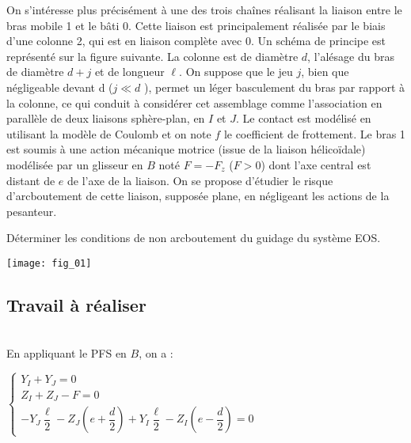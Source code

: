On s’intéresse plus précisément à une des trois chaînes réalisant la liaison entre le bras mobile 1 et le bâti
0. 
Cette liaison est principalement réalisée par le biais d’une colonne 2, qui est en liaison complète avec 0. Un schéma de principe est représenté sur la figure suivante. La colonne est de diamètre $d$, l’alésage du bras de diamètre
$d + j$ et  de longueur $\ell$. On suppose que le jeu $j$, bien que négligeable devant d ($j  \ll d$ ), permet un léger
basculement du bras par rapport à la colonne, ce qui conduit à considérer cet assemblage comme l’association en parallèle de deux liaisons sphère-plan, en $I$ et $J$. Le contact est modélisé en utilisant la modèle de Coulomb et on note $f$  le coefficient  de frottement. Le bras 1 est soumis à une action mécanique motrice (issue de la
liaison hélicoïdale) modélisée par un glisseur en $B$ noté $F = -F_z$ ($F > 0$) dont l’axe central est distant de $e$
de l’axe de la liaison. On se propose  d’étudier le risque d’arcboutement  de cette liaison, supposée plane, en négligeant les actions de la pesanteur.

\fi

\begin{obj}
Déterminer les conditions de non arcboutement du guidage du système EOS. 
\end{obj}


\ifprof
\else
\begin{center}
\texttt{[image: fig\_01]}
\end{center}

\fi

\subsection*{Travail à réaliser}
\ifprof
\begin{corrige}~\\

En appliquant le PFS en $B$, on a : 

$\left\{
\begin{array}{l}
Y_I + Y_J = 0 \\
Z_I + Z_J -F = 0 \\ 
-Y_J \dfrac{\ell}{2}-Z_J \left(e+\dfrac{d}{2}\right) 
+Y_I \dfrac{\ell}{2}-Z_I \left(e-\dfrac{d}{2}\right) = 0
\end{array}
\right.$
%
\end{corrige}


